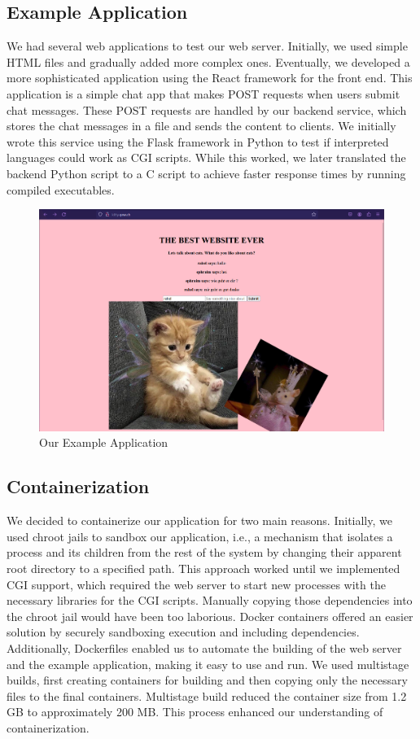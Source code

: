 \subsection*{Example Application}

We had several web applications to test our web server. Initially, we used simple HTML files and gradually added more complex ones. Eventually, we developed a more sophisticated application using the React framework for the front end. This application is a simple chat app that makes POST requests when users submit chat messages. These POST requests are handled by our backend service, which stores the chat messages in a file and sends the content to clients. We initially wrote this service using the Flask framework in Python to test if interpreted languages could work as CGI scripts. While this worked, we later translated the backend Python script to a C script to achieve faster response times by running compiled executables. 

\begin{figure}[h]
	\centering
	\includegraphics[width=\textwidth]{figures/screenshot_ex_app.png}
    \caption{Our Example Application}
\end{figure}

\subsection*{Containerization}
We decided to containerize our application for two main reasons. Initially, we used chroot jails to sandbox our application, i.e., a mechanism that isolates a process and its children from the rest of the system by changing their apparent root directory to a specified path. This approach worked until we implemented CGI support, which required the web server to start new processes with the necessary libraries for the CGI scripts. Manually copying those dependencies into the chroot jail would have been too laborious. Docker containers offered an easier solution by securely sandboxing execution and including dependencies. Additionally, Dockerfiles enabled us to automate the building of the web server and the example application, making it easy to use and run. We used multistage builds, first creating containers for building and then copying only the necessary files to the final containers. Multistage build reduced the container size from 1.2 GB to approximately 200 MB. This process enhanced our understanding of containerization.
